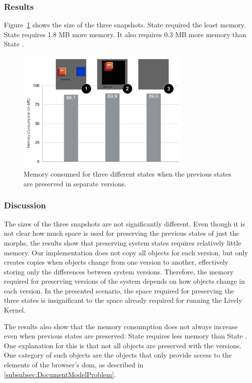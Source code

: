 \subsubsection{Results}
Figure~\ref{fig:MemoryOverheadForVersions} shows the size of the three snapshots.
State  required the least memory.
State  requires 1.8 MB more memory.
It also requires 0.3 MB more memory than State .

\begin{figure}[h!]
    \centering
    \includegraphics[width=0.76\textwidth]{figures/6_evaluation/2_memoryForVersions.pdf}
    \caption{Memory consumed for three different states when the previous states are preserved in separate versions.}
    \label{fig:MemoryOverheadForVersions}
\end{figure}

\subsubsection{Discussion}

The sizes of the three snapshots are not significantly different.
Even though it is not clear how much space is used for preserving the previous states of just the morphs, the results show that preserving system states requires relatively little memory.
Our implementation does not copy all objects for each version, but only creates copies when objects change from one version to another, effectively storing only the differences between system versions.
Therefore, the memory required for preserving versions of the system depends on how objects change in each version.
In the presented scenario, the space required for preserving the three states is insignificant to the space already required for running the Lively Kernel.

The results also show that the memory consumption does not always increase even when previous states are preserved: State  requires less memory than State .
One explanation for this is that not all objects are preserved with the versions.
One category of such objects are the objects that only provide access to the elements of the browser's \ac{dom}, as described in \ref{subsubsec:DocumentModelProblem}.


